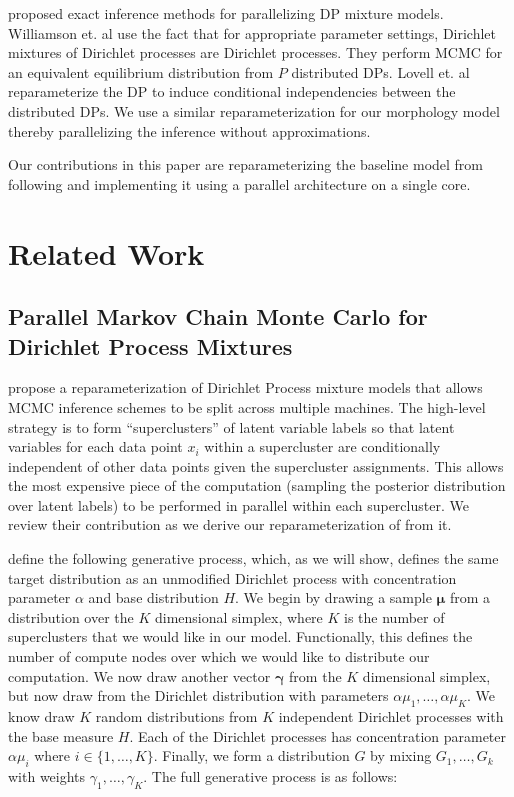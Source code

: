 \documentclass{article}
\begin{document}
\cite{lovell2012parallel,williamsonparallel} proposed exact inference methods
for parallelizing DP mixture models. Williamson et. al \cite{williamsonparallel}
 use the fact that for appropriate parameter settings, Dirichlet mixtures of
Dirichlet processes are Dirichlet processes. They perform MCMC for an equivalent
equilibrium distribution from $P$ distributed DPs. Lovell et. al \cite{lovell2012parallel}
 reparameterize the DP to induce conditional independencies between the 
distributed DPs. We use a similar reparameterization for our morphology
model thereby parallelizing the inference without approximations.

Our contributions in this paper are reparameterizing the baseline model
 from \cite{goldwater2011} following \cite{lovell2012parallel} and 
implementing it using a parallel architecture on a single core.

\section{Related Work}
\label{sec:related-work}

\subsection{Parallel Markov Chain Monte Carlo for Dirichlet Process Mixtures}
\label{sec:parallel-mcmc-for-dpm}

\cite{lovell2012} propose a reparameterization of Dirichlet Process
mixture models that allows MCMC inference schemes to be split across
multiple machines. The high-level strategy is to form
``superclusters'' of latent variable labels so that latent variables
for each data point $x_i$ within a supercluster are conditionally
independent of other data points given the supercluster
assignments. This allows the most expensive piece of the computation
(sampling the posterior distribution over latent labels) to be
performed in parallel within each supercluster. We review their
contribution as we derive our reparameterization of
\cite{goldwater2011} from it.

\cite{lovell2012} define the following generative process, which, as
we will show, defines the same target distribution as an unmodified
Dirichlet process with concentration parameter $\alpha$ and base
distribution $H$. We begin by drawing a sample $\boldsymbol{\mu}$ from
a distribution over the $K$ dimensional simplex, where $K$ is the
number of superclusters that we would like in our model. Functionally,
this defines the number of compute nodes over which we would like to
distribute our computation. We now draw another vector
$\boldsymbol{\gamma}$ from the $K$ dimensional simplex, but now draw
from the Dirichlet distribution with parameters $\alpha \mu_1, \ldots,
\alpha \mu_K$. We know draw $K$ random distributions from $K$
independent Dirichlet processes with the base measure $H$. Each of the
Dirichlet processes has concentration parameter $\alpha \mu_i$ where
$i \in \{1, \ldots, K\}$. Finally, we form a distribution $G$ by
mixing $G_1, \ldots, G_k$ with weights $\gamma_1, \ldots,
\gamma_K$. The full generative process is as follows:
\end{document}
